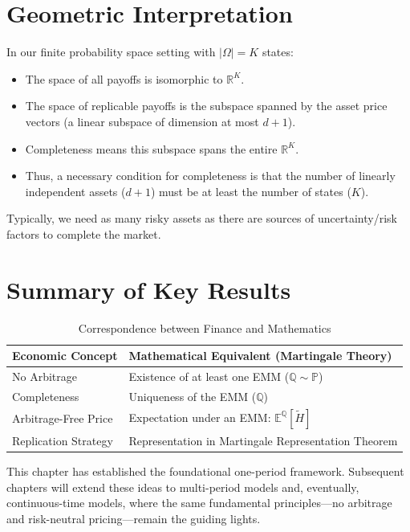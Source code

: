 \section{Geometric Interpretation}

In our finite probability space setting with $|\Omega| = K$ states:
\begin{itemize}
    \item The space of all payoffs is isomorphic to $\mathbb{R}^K$.
    \item The space of replicable payoffs is the subspace spanned by the asset price vectors (a linear subspace of dimension at most $d+1$).
    \item Completeness means this subspace spans the entire $\mathbb{R}^K$.
    \item Thus, a necessary condition for completeness is that the number of linearly independent assets ($d+1$) must be at least the number of states ($K$).
\end{itemize}

Typically, we need as many risky assets as there are sources of uncertainty/risk factors to complete the market.

\section{Summary of Key Results}

\begin{table}[h]
\centering
\begin{tabular}{|l|l|}
\hline
\textbf{Economic Concept} & \textbf{Mathematical Equivalent (Martingale Theory)} \\ \hline
No Arbitrage              & Existence of at least one EMM ($\mathbb{Q} \sim \mathbb{P}$) \\ \hline
Completeness              & Uniqueness of the EMM ($\mathbb{Q}$) \\ \hline
Arbitrage-Free Price      & Expectation under an EMM: $\mathbb{E}^\mathbb{Q}[\tilde{H}]$ \\ \hline
Replication Strategy      & Representation in Martingale Representation Theorem \\ \hline
\end{tabular}
\caption{Correspondence between Finance and Mathematics}
\label{tab:finance_math_correspondence}
\end{table}

This chapter has established the foundational one-period framework. Subsequent chapters will extend these ideas to multi-period models and, eventually, continuous-time models, where the same fundamental principles—no arbitrage and risk-neutral pricing—remain the guiding lights.
